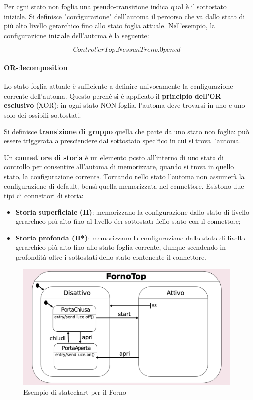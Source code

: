 Per ogni stato non foglia una pseudo-transizione indica qual è il sottostato iniziale. Si definisce "configurazione" dell'automa il percorso che va dallo stato di più alto livello gerarchico fino allo stato foglia attuale. Nell'esempio, la configurazione iniziale dell'automa è la seguente:

$$ControllerTop.NessunTreno.0pened$$

\paragraph{OR-decomposition} Lo stato foglia attuale è sufficiente a definire univocamente la configurazione corrente dell'automa. Questo perché si è applicato il \textbf{principio dell'OR esclusivo} (XOR): in ogni stato NON foglia, l'automa deve trovarsi in uno e uno solo dei ossibili sottostati.

Si definisce \textbf{transizione di gruppo} quella che parte da uno stato non foglia: può essere triggerata a presciendere dal sottostato specifico in cui si trova l'automa. 

Un \textbf{connettore di storia} è un elemento posto all'interno di uno stato di controllo per consentire all'automa di memorizzare, quando si trova in quello stato, la configurazione corrente. Tornando nello stato l'automa non assumerà la configurazione di default, bensì quella memorizzata nel connettore. Esistono due tipi di connettori di storia:
\begin{itemize}
    \item \textbf{Storia superficiale (H)}: memorizzano la configurazione dallo stato di livello gerarchico più alto fino al livello dei sottostati dello stato con il connettore;
    \item \textbf{Storia profonda (H*)}: memorizzano la configurazione dallo stato di livello gerarchico più alto fino allo stato foglia corrente, dunque scendendo in profondità oltre i sottostati dello stato contenente il connettore.
\end{itemize}

\begin{figure}[H]
    \centering
    \includegraphics[width=0.75\linewidth]{assets/UML/state/state5.png}
    \caption{Esempio di statechart per il Forno}
\end{figure}

